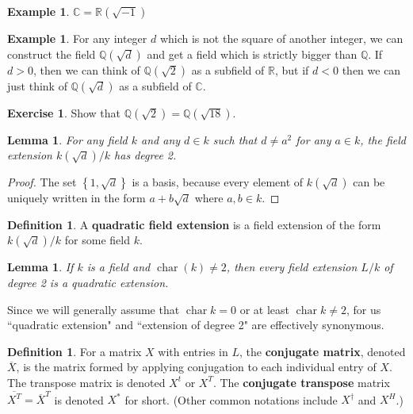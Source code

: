 \documentclass[12pt]{article}
\newtheorem{lemma}[theorem]{Lemma}
\theoremstyle{definition}
\newtheorem{definition}[theorem]{Definition}
\newtheorem{example}[theorem]{Example}
\newtheorem{exercise}[theorem]{Exercise}
\numberwithin{theorem}{subsection}
\newcommand{\Q}{\mathbb{Q}}
\newcommand{\R}{\mathbb{R}}
\newcommand{\C}{\mathbb{C}}
\newcommand{\lp}{\left(}
\newcommand{\rp}{\right)}
\newcommand{\lb}{\left\{}
\newcommand{\rb}{\right\}}
\newcommand{\tbf}{\textbf}
\newcommand{\noi}{\noindent}
\newcommand{\ov}{\overline}
\DeclareMathOperator{\characteristic}{char}
\begin{document}
\begin{example}
 $\C=\R\lp \sqrt{-1} \rp$
\end{example}

\begin{example}
For any integer $d$ which is not the square of another integer, we can construct the field $\Q \lp \sqrt{d} \rp$ and get a field which is strictly bigger than $\Q$. If $d > 0$, then we can think of $\Q\lp \sqrt{2} \rp$ as a subfield of $\R$, but if $d < 0$ then we can just think of $\Q \lp \sqrt{d} \rp$ as a subfield of $\C$.
\end{example}

\begin{exercise}
Show that $\Q(\sqrt{2}) = \Q(\sqrt{18})$.
\end{exercise}


\begin{lemma}
For any field $k$ and any $d \in k$ such that $d \neq a^2$ for any $a \in k$, the field extension $k \lp \sqrt{d} \rp/k$ has degree 2.
\end{lemma}
\begin{proof}
The set $\lb 1, \sqrt{d} \rb$ is a basis, because every element of $k \lp \sqrt{d} \rp$ can be uniquely written in the form $a + b \sqrt{d}$ where $a, b \in k$.
\end{proof}

\begin{definition}
A \tbf{quadratic field extension} is a field extension of the form $k \lp \sqrt{d} \rp/k$ for some field $k$.
\end{definition}

\begin{lemma}
If $k$ is a field and $\characteristic(k) \neq 2$, then every field extension $L/k$ of degree 2 is a quadratic extension.
\end{lemma}

\noi Since we will generally assume that $\characteristic k = 0$ or at least $\characteristic k \neq 2$, for us ``quadratic extension" and ``extension of degree 2" are effectively synonymous.

\begin{definition}
For a matrix $X$ with entries in $L$, the \tbf{conjugate matrix}, denoted $\ov X$, is the matrix formed by applying conjugation to each individual entry of $X$. The transpose matrix is denoted $X^t$ or $X^T$. The \tbf{conjugate transpose} matrix $\ov{X^T} = {\ov X}^T$ is denoted $X^*$ for short. (Other common notations include $X^\dagger$ and $X^H$.)
\end{definition}
\end{document}
